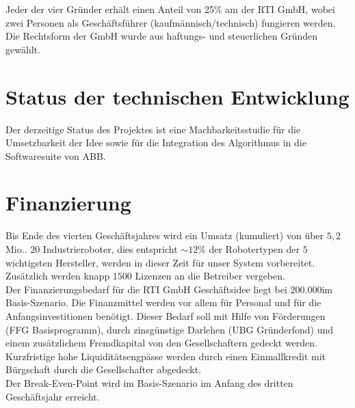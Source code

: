 Jeder der vier Gründer erhält einen Anteil von 25\% am der \textsf{RTI GmbH}, wobei zwei Personen als Geschäftsführer (kaufmännisch/technisch) fungieren werden. Die Rechtsform der GmbH wurde aus haftungs- und steuerlichen Gründen gewählt.


\section{Status der technischen Entwicklung}

Der derzeitige Status des Projektes ist eine Machbarkeitsstudie für die Umsetzbarkeit der Idee sowie für die Integration des Algorithmus in die Softwaresuite von ABB.

\section{Finanzierung}
Bis Ende des vierten Geschäftsjahres wird ein Umsatz (kumuliert) von über $5,2$Mio.\thinspace\officialeuro. $20$ Industrieroboter, dies entspricht $\sim12$\% der Robotertypen der $5$ wichtigsten Hersteller, werden in dieser Zeit für unser System vorbereitet. Zusätzlich werden knapp $1500$ Lizenzen an die Betreiber vergeben.\\
Der Finanzierungsbedarf für die \textsf{RTI GmbH} Geschäftsidee liegt bei $200.000$\officialeuro im Basis-Szenario. Die Finanzmittel werden vor allem für Personal und für die Anfangsinvestitionen benötigt. Dieser Bedarf soll mit Hilfe von Förderungen (FFG Basisprogramm), durch zinsgünstige Darlehen (UBG Gründerfond) und einem zusätzlichem Fremdkapital von den Gesellschaftern gedeckt werden. Kurzfristige hohe Liquiditätsengpässe werden durch einen Einmallkredit mit Bürgschaft durch die Gesellschafter abgedeckt.\\
Der Break-Even-Point wird im Basis-Szenario im Anfang des dritten Geschäftsjahr erreicht.



